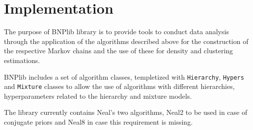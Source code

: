 
\chapter{Implementation}
The purpose of BNPlib library is to provide tools to conduct data analysis through the application of the algorithms described above for the construction of the respective Markov chains and the use of these for density and clustering estimations.

BNPlib includes a set of algorithm classes, templetized with \verb|Hierarchy|, \verb|Hypers| and \verb|Mixture| classes to allow the use of algorithms with different hierarchies, hyperparameters related to the hierarchy and mixture models.

The library currently contains Neal's two algorithms, Neal2 to be used in case of conjugate priors and Neal8 in case this requirement is missing.

